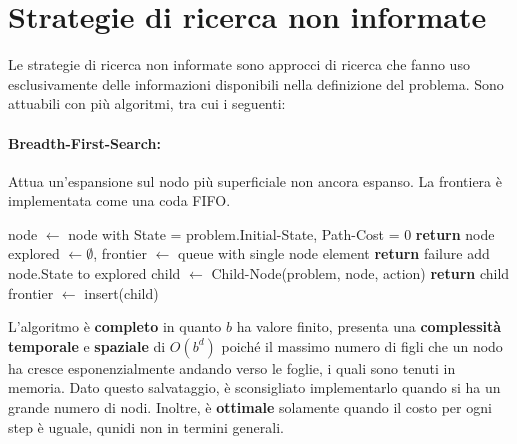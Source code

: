 %

\section{Strategie di ricerca non informate}
Le strategie di ricerca non informate sono approcci di ricerca che fanno uso esclusivamente delle informazioni disponibili nella definizione del
problema. Sono attuabili con più algoritmi, tra cui i seguenti:

\paragraph{Breadth-First-Search:} Attua un'espansione sul nodo più superficiale non ancora espanso. La frontiera è implementata come una coda FIFO.
\begin{algorithm}[h]
    \caption{BFS(problem) \textbf{returns} solution or failure}
    \begin{algorithmic}[i]
        \State node $\gets$ node with State = problem.Initial-State, Path-Cost = 0
         \textbf{return} node
        \EndIf
        \State explored $\gets \emptyset$, frontier $\gets$ queue with single node element
        \Loop
             \textbf{return} failure
            \EndIf
            \State add node.State to explored
                \State child $\gets$ Child-Node(problem, node, action)
                     \textbf{return} child
                    \EndIf
                    \State frontier $\gets$ insert(child)
                \EndIf
            \EndFor
        \EndLoop
    \end{algorithmic}
\end{algorithm}

\noindent L'algoritmo è \textbf{completo} in quanto $b$ ha valore finito, presenta una \textbf{complessità temporale} e \textbf{spaziale} di $O(b^d)$
poiché il massimo numero di figli che un nodo ha cresce esponenzialmente andando verso le foglie, i quali sono tenuti in memoria. Dato questo
salvataggio, è sconsigliato implementarlo quando si ha un grande numero di nodi. Inoltre, è \textbf{ottimale} solamente quando il costo per ogni step è
uguale, qunidi non in termini generali.

